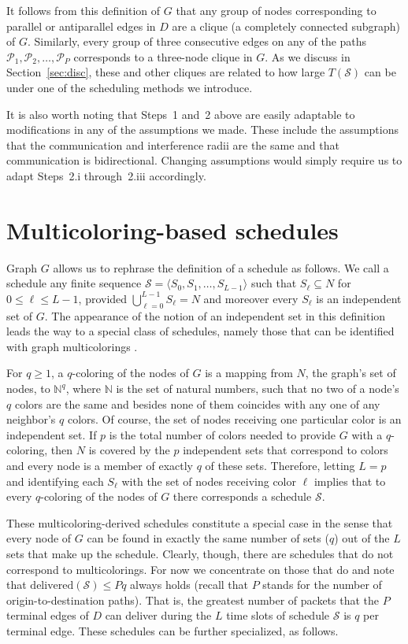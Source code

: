 \documentclass{article}
\begin{document}
It follows from this definition of $G$ that any group of nodes corresponding to
parallel or antiparallel edges in $D$ are a clique (a completely connected
subgraph) of $G$. Similarly, every group of three consecutive edges on any of
the paths $\mathcal{P}_1,\mathcal{P}_2,\ldots,\mathcal{P}_P$ corresponds to a
three-node clique in $G$. As we discuss in Section~\ref{sec:disc}, these and
other cliques are related to how large $T(\mathcal{S})$ can be under one of the
scheduling methods we introduce.

It is also worth noting that Steps~1 and~2 above are easily adaptable to
modifications in any of the assumptions we made. These include the assumptions
that the communication and interference radii are the same and that
communication is bidirectional. Changing assumptions would simply require us to
adapt Steps~2.i through~2.iii accordingly.

\section{Multicoloring-based schedules}\label{sec:multic}

Graph $G$ allows us to rephrase the definition of a schedule as follows. We call
a schedule any finite sequence
$\mathcal{S}=\langle S_0,S_1,\ldots,S_{L-1}\rangle$ such that
$S_\ell\subseteq N$ for $0\le\ell\le L-1$, provided
$\bigcup_{\ell=0}^{L-1}S_\ell=N$ and moreover every $S_\ell$ is an independent
set of $G$. The appearance of the notion of an independent set in this
definition leads the way to a special class of schedules, namely those that can
be identified with graph multicolorings \cite{s76}.

For $q\ge 1$, a $q$-coloring of the nodes of $G$ is a mapping from $N$, the
graph's set of nodes, to $\mathbb{N}^q$, where $\mathbb{N}$ is the set of
natural numbers, such that no two of a node's $q$ colors are the same and
besides none of them coincides with any one of any neighbor's $q$ colors. Of
course, the set of nodes receiving one particular color is an independent set.
If $p$ is the total number of colors needed to provide $G$ with a $q$-coloring,
then $N$ is covered by the $p$ independent sets that correspond to colors and
every node is a member of exactly $q$ of these sets. Therefore, letting $L=p$
and identifying each $S_\ell$ with the set of nodes receiving color $\ell$
implies that to every $q$-coloring of the nodes of $G$ there corresponds a
schedule $\mathcal{S}$.

These multicoloring-derived schedules constitute a special case in the sense
that every node of $G$ can be found in exactly the same number of sets ($q$) out
of the $L$ sets that make up the schedule. Clearly, though, there are schedules
that do not correspond to multicolorings. For now we concentrate on those that
do and note that $\mathrm{delivered}(\mathcal{S})\le Pq$ always holds (recall
that $P$ stands for the number of origin-to-destination paths). That is,
the greatest number of packets that the $P$ terminal edges of $D$ can deliver
during the $L$ time slots of schedule $\mathcal{S}$ is $q$ per terminal edge.
These schedules can be further specialized, as follows.
\end{document}
